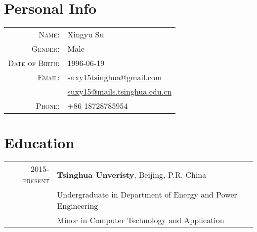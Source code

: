 \documentclass[a4paper,10pt]{article}
\begin{document}
\pagestyle{empty} %

\par{\bigskip\par}

\section{Personal Info}
\begin{tabular}{rl}
    \textsc{Name:}          & Xingyu Su \\
    \textsc{Gender:}        & Male \\
    \textsc{Date of Birth:} & 1996-06-19 \\
    \textsc{Email:}         & \href{mailto:suxy15tsinghua@gmail.com}{suxy15tsinghua@gmail.com} \\
                            & \href{mailto:suxy15@mails.tsinghua.edu.cn}{suxy15@mails.tsinghua.edu.cn} \\
    \textsc{Phone:}         & +86 18728785954 \\
\end{tabular}

\section{Education}
\begin{tabular}{rl}
\textsc{2015-present} & \normalsize\textbf{Tsinghua Unveristy}, Beijing, P.R. China \\
                      & Undergraduate in Department of Energy and Power Engineering \\
                      & Minor in Computer Technology and Application \\
\end{tabular}

\end{document}
